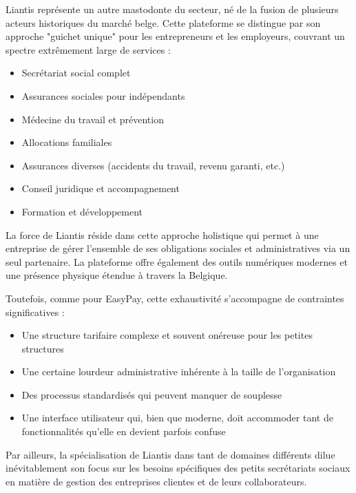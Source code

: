 \documentclass[12pt,a4paper]{report}
\begin{document}

Liantis représente un autre mastodonte du secteur, né de la fusion de plusieurs acteurs historiques du marché belge. Cette plateforme se distingue par son approche "guichet unique" pour les entrepreneurs et les employeurs, couvrant un spectre extrêmement large de services :

\begin{itemize}
  \item Secrétariat social complet
  \item Assurances sociales pour indépendants
  \item Médecine du travail et prévention
  \item Allocations familiales
  \item Assurances diverses (accidents du travail, revenu garanti, etc.)
  \item Conseil juridique et accompagnement
  \item Formation et développement
\end{itemize}

La force de Liantis réside dans cette approche holistique qui permet à une entreprise de gérer l'ensemble de ses obligations sociales et administratives via un seul partenaire. La plateforme offre également des outils numériques modernes et une présence physique étendue à travers la Belgique.

Toutefois, comme pour EasyPay, cette exhaustivité s'accompagne de contraintes significatives :
\begin{itemize}
  \item Une structure tarifaire complexe et souvent onéreuse pour les petites structures
  \item Une certaine lourdeur administrative inhérente à la taille de l'organisation
  \item Des processus standardisés qui peuvent manquer de souplesse
  \item Une interface utilisateur qui, bien que moderne, doit accommoder tant de fonctionnalités qu'elle en devient parfois confuse
\end{itemize}

Par ailleurs, la spécialisation de Liantis dans tant de domaines différents dilue inévitablement son focus sur les besoins spécifiques des petits secrétariats sociaux en matière de gestion des entreprises clientes et de leurs collaborateurs.
\end{document}
